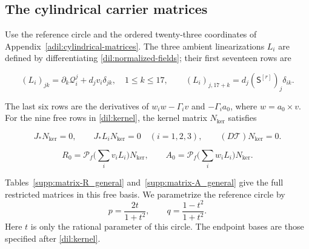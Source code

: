 \subsection{The cylindrical carrier matrices}

Use the reference circle and the ordered twenty-three coordinates of
Appendix~\ref{adil:cylindrical-matrices}. The three ambient
linearizations $L_i$ are defined by differentiating
\eqref{dil:normalized-fields}; their first seventeen rows are

\begin{equation}\label{supp:dil:L-matrix-definition}
 (L_i)_{jk}=\partial_k\mathcal Q_i^j+d_jv_i\delta_{jk},\quad 1\le k\le17,
 \qquad (L_i)_{j,17+k}=d_j(\mathsf S^{[r]})_j\delta_{ik}.
\end{equation}

The last six rows are the derivatives of
$w_iw-\Gamma_i v$ and $-\Gamma_i a_0$, where $w=a_0\times v$.
For the nine free rows in \eqref{dil:kernel}, the kernel matrix
$N_{\mathrm{ker}}$ satisfies

\begin{equation}\label{supp:dil:kernel-identities}
 J_*N_{\mathrm{ker}}=0,\qquad J_*L_iN_{\mathrm{ker}}=0\quad(i=1,2,3),\qquad
                         (D\mathcal T)N_{\mathrm{ker}}=0.
\end{equation}

\begin{equation}\label{supp:dil:restricted-matrices}
 R_0=\mathcal P_f\Big(\sum_iv_iL_i\Big)N_{\mathrm{ker}},\qquad
 A_0=\mathcal P_f\Big(\sum_iw_iL_i\Big)N_{\mathrm{ker}}.
\end{equation}

Tables~\ref{supp:matrix-R_general} and~\ref{supp:matrix-A_general}
give the full restricted matrices in this free basis. We parametrize
the reference circle by
\[
 p=\frac{2t}{1+t^2},\qquad q=\frac{1-t^2}{1+t^2}.
\]
Here $t$ is only the rational parameter of this circle. The endpoint
bases are those specified after \eqref{dil:kernel}.

